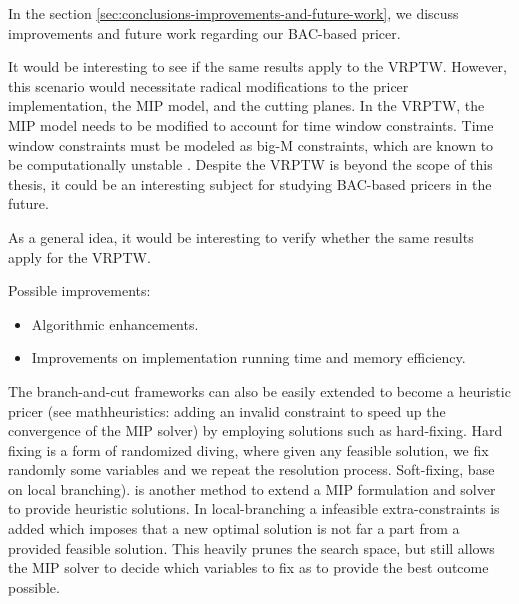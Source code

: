 In the section \cref{sec:conclusions-improvements-and-future-work},
we discuss improvements and future work regarding our BAC-based pricer.

It would be interesting to see if the same results apply to the VRPTW.
However, this scenario would necessitate radical modifications
to the pricer implementation, the MIP model, and the cutting planes.
In the VRPTW, the MIP model needs to be modified to account for
time window constraints.
Time window constraints must be modeled as big-M constraints,
which are known to be computationally unstable \parencite{jepsen2008branchandcut}.
Despite the VRPTW is beyond the scope of this thesis,
it could be an interesting subject for studying BAC-based pricers in the future.

As a general idea, it would be interesting to verify
whether the same results apply for the VRPTW.

Possible improvements:
\begin{itemize}
	\item Algorithmic enhancements.
	\item Improvements on implementation running time and memory efficiency.
\end{itemize}




The branch-and-cut frameworks can also be easily extended
to become a heuristic pricer
(see mathheuristics: adding an invalid constraint to speed up the convergence of the MIP solver)
by employing
solutions such as hard-fixing.
Hard fixing is a form of randomized diving,
where given any feasible solution,
we fix randomly some variables and we repeat the resolution
process.
Soft-fixing, base on local branching). is another method
to extend a MIP formulation and solver to provide
heuristic solutions.
In local-branching a infeasible extra-constraints is added
which imposes that a new optimal solution
is not far a part from a provided feasible solution.
This heavily prunes the search space, but still
allows the MIP solver to decide which variables
to fix as to provide the best outcome possible.

